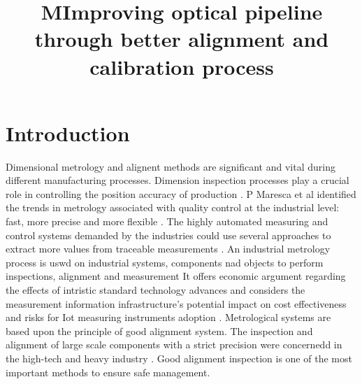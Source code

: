 \documentclass[10pt, a4paper, onecolumn]{article}
\begin{document}
	\title{MImproving optical pipeline through better alignment and calibration process}
	\maketitle
	\section*{Introduction}
	\label{intro}
		Dimensional metrology and alignent methods are significant and vital during different manufacturing processes. Dimension inspection processes play a crucial role in controlling the position accuracy of production \cite{gu2020study}. P Maresca et al identified the trends in metrology associated with quality control at the industrial level: fast, more precise and more flexible \cite{maresca2019evaluation}. The highly automated measuring and control systems demanded by the industries could use several approaches to extract more values from traceable measurements \cite{hall2019opportunity}. An industrial metrology process is uswd on industrial systems, components nad objects to perform inspections, alignment and measurement \cite{morumachine} It offers economic argument regarding the effects of intristic standard technology advances and considers the measurement information infrastructure's potential impact on cost effectiveness and risks for Iot measuring instruments adoption \cite{kuster2020measurement}. Metrological systems are based upon the principle of good alignment system. The inspection and alignment of large scale components with a strict precision were concernedd in the high-tech and heavy industry \cite{gu2020study}. Good alignment inspection is one of the most important methods to ensure safe management.
	\newpage
	
	
\end{document}
